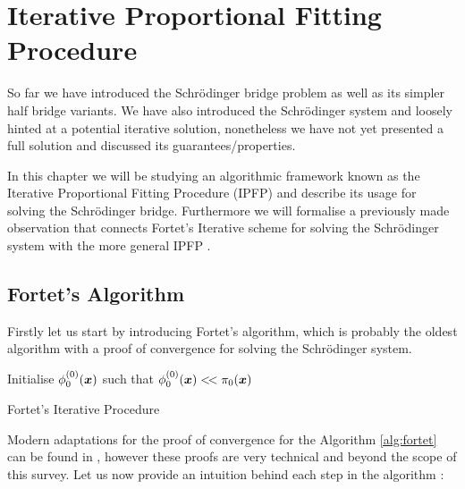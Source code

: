 \documentclass[a4paper,12pt,twoside,openright]{report}
\theoremstyle{definition}
\begin{document}
\chapter{Iterative Proportional Fitting Procedure}

So far we have introduced the Schrödinger bridge problem as well as its simpler half bridge variants. We have also introduced the Schrödinger system and loosely hinted at a potential iterative solution, nonetheless we have not yet presented a full solution and discussed its guarantees/properties.

In this chapter we will be studying an algorithmic framework known as the Iterative Proportional Fitting Procedure (IPFP) \citep{csiszar1975divergence, kullback1968probability, ruschendorf1995convergence,cramer2000probability} and describe its usage for solving the Schrödinger bridge. Furthermore we will formalise a previously made observation that connects Fortet's Iterative scheme \citep{fortet1940resolution} for solving the Schrödinger system with the more general IPFP . 

\section{Fortet's Algorithm}

Firstly let us start by introducing Fortet's algorithm, which is probably the oldest algorithm with a proof of convergence \cite{fortet1940resolution} for solving the Schrödinger system.

\begin{algorithm} \label{alg:fortet}
Initialise $\phi_0^{(0)}({\bm{x}})$ such that $\phi_0^{(0)}({\bm{x}}) <\!< \pi_0({\bm{x}})$ \\
\caption{Fortet's Iterative Procedure}
\end{algorithm}
Modern adaptations for the proof of convergence for the Algorithm  \ref{alg:fortet} can be found in \citep{essid2019traversing, chen2016entropic}, however these proofs are very technical and beyond the scope of this survey.  Let us now provide an intuition behind each step in the algorithm :
\end{document}
